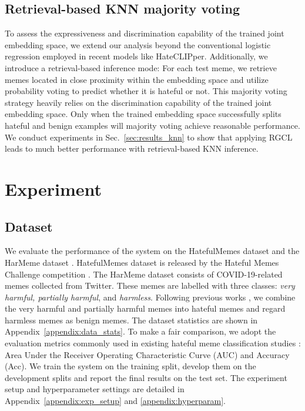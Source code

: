 \documentclass[11pt]{article}
\begin{document}
\subsection{Retrieval-based KNN majority voting}
To assess the expressiveness and discrimination capability of the trained joint embedding space, we extend our analysis beyond the conventional logistic regression employed in recent models like HateCLIPper. Additionally, we introduce a retrieval-based inference mode: For each test meme, we retrieve memes located in close proximity within the embedding space and utilize probability voting to predict whether it is hateful or not.
This majority voting strategy heavily relies on the discrimination capability of the trained joint embedding space.
Only when the trained embedding space successfully splits hateful and benign examples will majority voting achieve reasonable performance.
We conduct experiments in Sec.~\ref{sec:results_knn} to show that applying RGCL leads to much better performance with retrieval-based KNN inference. 
\section{Experiment}
\subsection{Dataset}
We evaluate the performance of the system on the HatefulMemes dataset \cite{KielaFBHMC2020} and the HarMeme dataset \cite{pramanickCovidMeme2021}. HatefulMemes dataset is released by the Hateful Memes Challenge competition \cite{KielaFBHMC2020}.
The HarMeme dataset consists of COVID-19-related memes collected from Twitter. These memes are labelled with three classes: \textit{very harmful, partially harmful}, and \textit{harmless}. Following previous works \cite{caoPromptHate2022, PramanickMomenta2021}, we combine the very harmful and partially harmful memes into hateful memes and regard harmless memes as benign memes. The dataset statistics are shown in Appendix~\ref{appendix:data_stats}. To make a fair comparison, we adopt the evaluation metrics commonly used in existing hateful meme classification studies \cite{KumarHateClip2022, caoPromptHate2022, KielaFBHMC2020}: Area Under the Receiver Operating Characteristic Curve (AUC) and Accuracy (Acc). We train the system on the training split, develop them on the development splits and report the final results on the test set. The experiment setup and hyperparameter settings are detailed in Appendix~\ref{appendix:exp_setup} and \ref{appendix:hyperparam}. 
\end{document}

